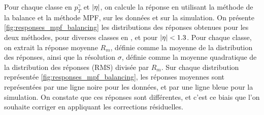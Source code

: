 Pour chaque classe en $p_T^{\gamma}$ et $\lvert \eta \rvert$, on calcule la réponse en utilisant la méthode de la balance et la méthode MPF, sur les données et sur la simulation. On présente \cref{fig:responses_mpf_balancing} les distributions des réponses obtenues pour les deux méthodes, pour diverses classes en \pt, et pour $\lvert \eta \rvert < \num{1.3}$. Pour chaque classe, on extrait la réponse moyenne $R_m$, définie comme la moyenne de la distribution des réponses, ainsi que la résolution $\sigma$, définie comme la moyenne quadratique de la distribution des réponses (RMS) divisée par $R_m$. Sur chaque distribution représentée \cref{fig:responses_mpf_balancing}, les réponses moyennes sont représentées par une ligne noire pour les données, et par une ligne bleue pour la simulation. On constate que ces réponses sont différentes, et c'est ce biais que l'on souhaite corriger en appliquant les corrections résiduelles.

